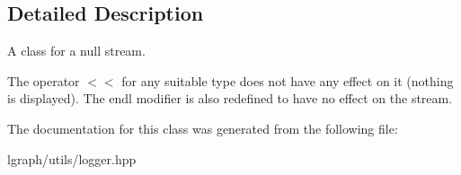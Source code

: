 \subsection{Detailed Description}
A class for a null stream. 

The operator \textquotesingle{}$<$$<$\textquotesingle{} for any suitable type does not have any effect on it (nothing is displayed). The \textquotesingle{}endl\textquotesingle{} modifier is also redefined to have no effect on the stream. 

The documentation for this class was generated from the following file\+:\begin{DoxyCompactItemize}
\item 
lgraph/utils/logger.\+hpp\end{DoxyCompactItemize}
